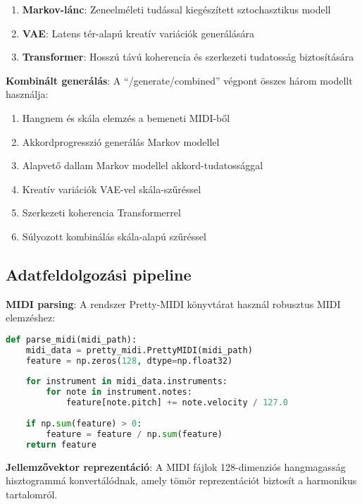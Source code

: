 \begin{enumerate}
\item \textbf{Markov-lánc}: Zeneelméleti tudással kiegészített sztochasztikus modell
\item \textbf{VAE}: Latens tér-alapú kreatív variációk generálására
\item \textbf{Transformer}: Hosszú távú koherencia és szerkezeti tudatosság biztosítására
\end{enumerate}

\textbf{Kombinált generálás}: A ``/generate/combined'' végpont összes három modellt használja:
\begin{enumerate}
\item Hangnem és skála elemzés a bemeneti MIDI-ből
\item Akkordprogresszió generálás Markov modellel
\item Alapvető dallam Markov modellel akkord-tudatossággal
\item Kreatív variációk VAE-vel skála-szűréssel
\item Szerkezeti koherencia Transformerrel
\item Súlyozott kombinálás skála-alapú szűréssel
\end{enumerate}

\subsection{Adatfeldolgozási pipeline}
\textbf{MIDI parsing}: A rendszer Pretty-MIDI könyvtárat használ robusztus MIDI elemzéshez:
\begin{lstlisting}[language=Python]
def parse_midi(midi_path):
    midi_data = pretty_midi.PrettyMIDI(midi_path)
    feature = np.zeros(128, dtype=np.float32)
    
    for instrument in midi_data.instruments:
        for note in instrument.notes:
            feature[note.pitch] += note.velocity / 127.0
    
    if np.sum(feature) > 0:
        feature = feature / np.sum(feature)
    return feature
\end{lstlisting}

\textbf{Jellemzővektor reprezentáció}: A MIDI fájlok 128-dimenziós hangmagasság hisztogrammá konvertálódnak, amely tömör reprezentációt biztosít a harmonikus tartalomról.

